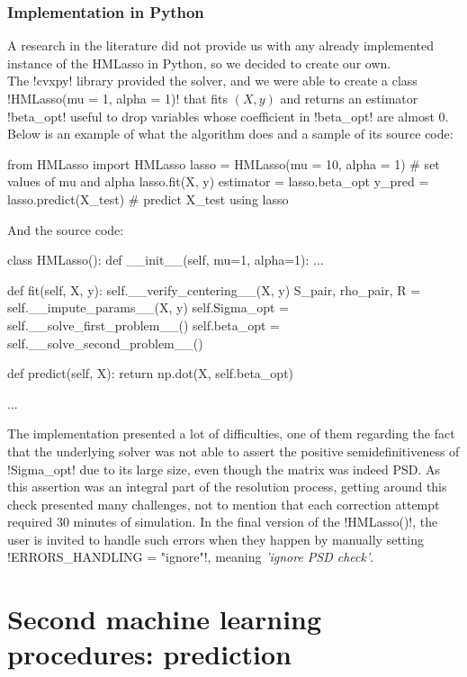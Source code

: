 \documentclass[]{article}
\begin{document}
\subsubsection{Implementation in Python}
A research in the literature did not provide us with any already implemented instance of the HMLasso in Python, so we decided to create our own.\\
The \pyth!cvxpy! library provided the solver, and we were able to create a class \pyth!HMLasso(mu = 1, alpha = 1)! that fits $(X, y)$ and returns an estimator \pyth!beta_opt! useful to drop variables whose coefficient in \pyth!beta_opt! are almost $0$. Below is an example of what the algorithm does and a sample of its source code:
\begin{python}
	from HMLasso import HMLasso
	lasso = HMLasso(mu = 10, alpha = 1) # set values of mu and alpha
	lasso.fit(X, y)
	estimator = lasso.beta_opt
	y_pred = lasso.predict(X_test) # predict X_test using lasso
\end{python}
And the source code:
\begin{python}
	class HMLasso():
		def __init__(self, mu=1, alpha=1):
		...
		
		def fit(self, X, y):
			self.__verify_centering__(X, y)
			S_pair, rho_pair, R = self.__impute_params__(X, y)
			self.Sigma_opt = self.__solve_first_problem__()
			self.beta_opt = self.__solve_second_problem__()
			
		def predict(self, X):
			return np.dot(X, self.beta_opt)
		
		...
\end{python}
The implementation presented a lot of difficulties, one of them regarding the fact that the underlying solver was not able to assert the positive semidefinitiveness of \pyth!Sigma_opt! due to its large size, even though the matrix was indeed PSD. As this assertion was an integral part of the resolution process, getting around this check presented many challenges, not to mention that each correction attempt required 30 minutes of simulation. In the final version of the \pyth!HMLasso()!, the user is invited to handle such errors when they happen by manually setting \pyth!ERRORS_HANDLING =  "ignore"!, meaning \textit{'ignore PSD check'}.

\section{Second machine learning procedures: prediction}
\end{document}
